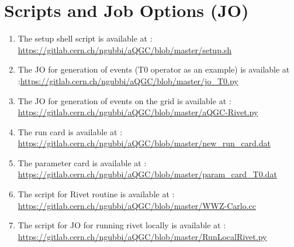 \chapter{Scripts and Job Options (JO)}	\label{Scripts}


\begin{enumerate}
	\item The setup shell script is available at : \url{https://gitlab.cern.ch/ngubbi/aQGC/blob/master/setup.sh}

	\item The JO for generation of events (T0 operator as an example) is available at :\url{https://gitlab.cern.ch/ngubbi/aQGC/blob/master/jo_T0.py} 

	\item The JO for generation of events on the grid is available at : \url{https://gitlab.cern.ch/ngubbi/aQGC/blob/master/aQGC-Rivet.py}
	
	\item The run card is available at : \url{https://gitlab.cern.ch/ngubbi/aQGC/blob/master/new_run_card.dat}
	
	\item The parameter card is available at : \url{https://gitlab.cern.ch/ngubbi/aQGC/blob/master/param_card_T0.dat}
	
	\item 	The script for Rivet routine is available at : \url{https://gitlab.cern.ch/ngubbi/aQGC/blob/master/WWZ-Carlo.cc}

	\item 	The script for JO for running rivet locally is available at : \url{https://gitlab.cern.ch/ngubbi/aQGC/blob/master/RunLocalRivet.py}
	
	
\end{enumerate}



